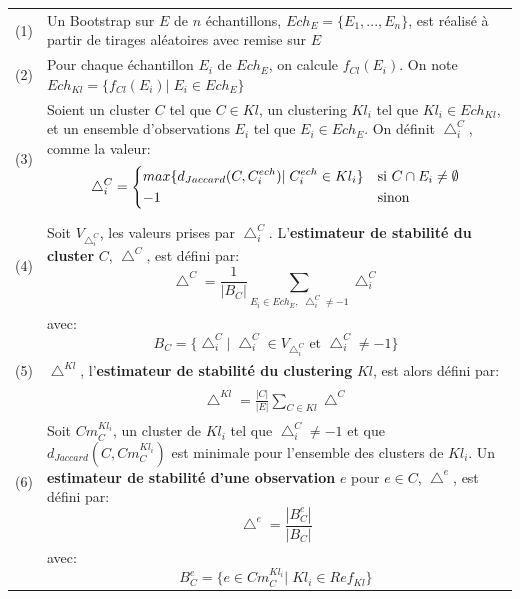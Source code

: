 \begin{longtable}{p{}p{}}
	(1) & \textrm{Un Bootstrap sur $E$ de $n$ échantillons, $Ech_{E}=\{E_{1},...,E_{n}\}$, est réalisé à partir de tirages aléatoires avec remise sur $E$}\\
	(2) & Pour chaque échantillon $E_{i}$ de $Ech_{E}$, on calcule $f_{Cl}(E_{i})$. \textrm{On note $Ech_{Kl}=\{f_{Cl}(E_{i})|\;  E_{i} \in Ech_{E}\}$}\\
	(3) & Soient un cluster $C$ tel que $C \in Kl$, un clustering $Kl_{i}$ tel que $Kl_{i} \in Ech_{Kl}$, et un ensemble d'observations $E_{i}$ tel que $E_{i} \in Ech_{E}$. On définit $\bigtriangleup_{i}^{C}$, comme la valeur:
	     	\begin{equation}
	     	\bigtriangleup_{i}^{C}=
				\begin{dcases}
			 	max\{d_{Jaccard}(C,C_{i}^{ech})|\; C_{i}^{ech} \in Kl_{i} \} & \textrm{si } C \cap E_{i} \neq\emptyset\\
			 	-1 & \textrm{sinon}
	 			\end{dcases}
	     	\end{equation}\\
	(4) & Soit $V_{\bigtriangleup_{i}^{C}}$, les valeurs prises par $\bigtriangleup_{i}^{C}$. L'\textbf{estimateur de stabilité du cluster} $C$, $\bigtriangleup^{C}$, est défini par:
	     	\begin{equation}
			\label{eqestimstabC}
			\bigtriangleup^{C}=\frac{1}{|B_{C}|}\sum_{E_{i} \in Ech_{E},\;\bigtriangleup_{i}^{C}\neq-1 }\bigtriangleup_{i}^{C}
	     	\end{equation}\\
	    & avec:
	     $$
		B_{C}=\{ \bigtriangleup_{i}^{C}|\; \bigtriangleup_{i}^{C}\in V_{\bigtriangleup_{i}^{C}} \textrm{ et }  \bigtriangleup_{i}^{C}\neq -1 \}
		$$\\
	(5) & $\bigtriangleup^{Kl}$, l'\textbf{estimateur de stabilité du clustering} $Kl$, est alors défini par:\\
	     &	\begin{equation}\label{eqestimstaball}
				\begin{split}
				\bigtriangleup^{Kl}=\frac{|C|}{|E|}\sum_{C \in Kl}\bigtriangleup^{C}
				\end{split}
	     	\end{equation}\\
	(6) & Soit $Cm^{Kl_{i}}_{C}$, un cluster de $Kl_{i}$ tel que $\bigtriangleup_{i}^{C}\neq-1$ et que $d_{Jaccard}(C,Cm^{Kl_{i}}_{C})$ est minimale pour l'ensemble des clusters de $Kl_{i}$. Un \textbf{estimateur de stabilité d'une observation} $e$ pour $e \in C$, $\bigtriangleup^{e}$, est défini par:
	     	\begin{equation}\label{eqestimstabr}
				\bigtriangleup^{e}=\frac{|B^{e}_{C}|}{|B_{C}|}
	     	\end{equation}\\
	     & avec:
		$$
		B^{e}_{C}=\{e \in Cm^{Kl_{i}}_{C}|\; Kl_{i} \in Ref_{Kl}\}
		$$\\
\end{longtable}

